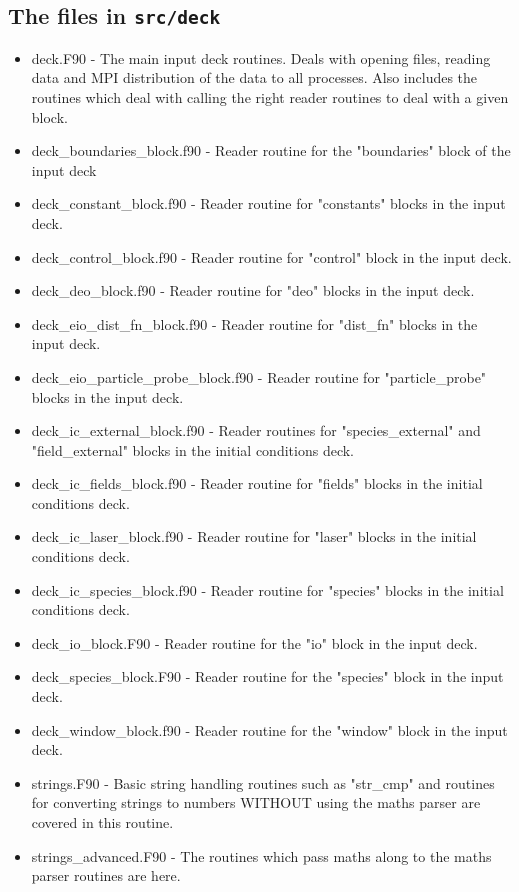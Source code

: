 \documentclass[12pt,a4paper]{article}
\newcommand{\inlinecode}[1]{{\color{warwickred} \bf\texttt{#1}}}
\begin{document}
\subsection{The files in \inlinecode{src/deck}}
\begin{itemize}
\item deck.F90 - The main input deck routines. Deals with opening files,
  reading data and MPI distribution of the data to all processes. Also
  includes the routines which deal with calling the right reader routines to
  deal with a given block.
\item deck\_boundaries\_block.f90 - Reader routine for the "boundaries" block
  of the input deck
\item deck\_constant\_block.f90 - Reader routine for "constants" blocks in the
  input deck.
\item deck\_control\_block.f90 - Reader routine for "control" block in the
  input deck.
\item deck\_deo\_block.f90 - Reader routine for "deo" blocks in the input
  deck.
\item deck\_eio\_dist\_fn\_block.f90 - Reader routine for "dist\_fn" blocks in
  the input deck.
\item deck\_eio\_particle\_probe\_block.f90 - Reader routine for
  "particle\_probe" blocks in the input deck.
\item deck\_ic\_external\_block.f90 - Reader routines for "species\_external"
  and "field\_external" blocks in the initial conditions deck.
\item deck\_ic\_fields\_block.f90 - Reader routine for "fields" blocks in the
  initial conditions deck.
\item deck\_ic\_laser\_block.f90 - Reader routine for "laser" blocks in the
  initial conditions deck.
\item deck\_ic\_species\_block.f90 - Reader routine for "species" blocks in
  the initial conditions deck.
\item deck\_io\_block.F90 - Reader routine for the "io" block in the input
  deck.
\item deck\_species\_block.F90 - Reader routine for the "species" block in the
  input deck.
\item deck\_window\_block.f90 - Reader routine for the "window" block in the
  input deck.
\item strings.F90 - Basic string handling routines such as "str\_cmp" and
  routines for converting strings to numbers WITHOUT using the maths parser
  are covered in this routine.
\item strings\_advanced.F90 - The routines which pass maths along to the maths
  parser routines are here.
\end{itemize}
\end{document}

